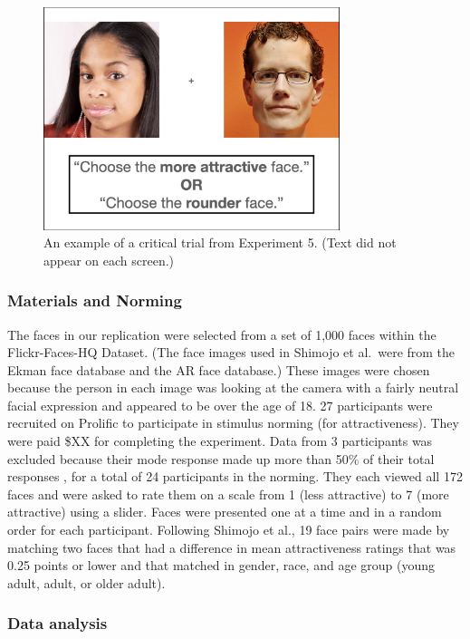 \documentclass[
  man,floatsintext]{apa6}
\begin{document}
\begin{figure}
\includegraphics[width=3.41in]{group-e/E5-example-figure} \caption{An example of a critical trial from Experiment 5. (Text did not appear on each screen.)}\label{fig:E5-example-trial}
\end{figure}

\hypertarget{materials-and-norming}{%
\subsubsection{Materials and Norming}\label{materials-and-norming}}

The faces in our replication were selected from a set of 1,000 faces
within the Flickr-Faces-HQ Dataset. (The face images used in Shimojo et
al.~were from the Ekman face database and the AR face database.) These
images were chosen because the person in each image was looking at the
camera with a fairly neutral facial expression and appeared to be over
the age of 18. 27 participants were recruited on Prolific to participate
in stimulus norming (for attractiveness). They were paid \$XX for
completing the experiment. Data from 3 participants was excluded because
their mode response made up more than 50\% of their total responses
, for a total of 24 participants
in the norming. They each viewed all 172 faces and were asked to rate
them on a scale from 1 (less attractive) to 7 (more attractive) using a
slider. Faces were presented one at a time and in a random order for
each participant. Following Shimojo et al., 19 face pairs were made by
matching two faces that had a difference in mean attractiveness ratings
that was 0.25 points or lower and that matched in gender, race, and age
group (young adult, adult, or older adult).

\hypertarget{data-analysis}{%
\subsubsection{Data analysis}\label{data-analysis}}
\end{document}
